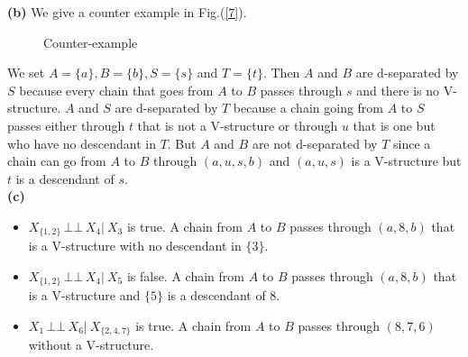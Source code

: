 \documentclass[10pt]{article}
\newcommand{\indep}{\ensuremath{\,\bot\!\!\!\bot\,}} %
\begin{document}
\textbf{(b) }We give a counter example in Fig.(\ref{7}). 
\begin{figure}[h!]
\centering
{}
\caption{Counter-example}
\label{fig7}
\end{figure}
We set $A=\{a\}, B=\{b\}, S=\{s\}$ and $T=\{t\}$. Then $A$ and $B$ are d-separated by $S$ because every chain that goes from $A$ to $B$ passes through $s$ and there is no V-structure. $A$ and $S$ are d-separated by $T$ because a chain going from $A$ to $S$ passes either through $t$ that is not a V-structure or through $u$ that is one but who have no descendant in $T$. But $A$ and $B$ are not d-separated by $T$ since a chain can go from $A$ to $B$ through $(a,u,s,b)$ and $(a,u,s)$ is a V-structure but $t$ is a descendant of $s$.\\





\textbf{(c) }
\begin{itemize}
\item $X_{\{1,2\}} \indep X_4 |\ X_3$ is true. A chain from $A$ to $B$ passes through $(a,8,b)$ that is a V-structure with no descendant in $\{3\}$.

\item $X_{\{1,2\}} \indep X_4 |\ X_5$ is false. A chain from $A$ to $B$ passes through $(a,8,b)$ that is a V-structure and $\{5\}$ is a descendant of 8.

\item $X_1 \indep X_6 |\ X_{\{ 2,4,7 \}}$ is true. A chain from $A$ to $B$ passes through $(8,7,6)$ without a V-structure.
\end{itemize}
\end{document}
